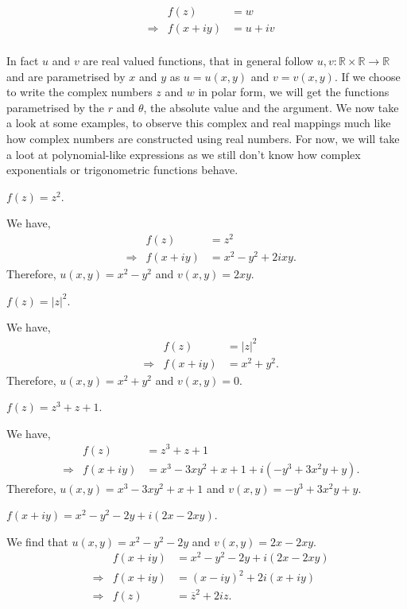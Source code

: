 \documentclass[12pt]{book}
\begin{document}
\begin{align*}
    &&f(z) 
        &= w \\
    &\Rightarrow &f(x + iy) 
        &= u + iv \\
\end{align*}

In fact $u$ and $v$ are real valued functions, that in general follow $u, v: \mathbb{R} \times \mathbb{R} \rightarrow \mathbb{R}$ and are parametrised by $x$ and $y$ as $u = u(x, y)$ and $v = v(x, y)$. If we choose to write the complex numbers $z$ and $w$ in polar form, we will get the functions parametrised by the $r$ and $\theta$, the absolute value and the argument. We now take a look at some examples, to observe this complex and real mappings much like how complex numbers are constructed using real numbers. For now, we will take a loot at polynomial-like expressions as we still don't know how complex exponentials or trigonometric functions behave.

\begin{exmp}
    $f(z) = z^2.$
\end{exmp}
We have,
\begin{align*}
    &&f(z) 
        &= z^2 \\
    &\Rightarrow &f(x + iy) 
        &= x^2 - y^2 + 2ixy .
\end{align*}
Therefore, $u(x, y) = x^2 - y^2$ and $v(x, y) = 2xy.$

\begin{exmp}
    $f(z) = |z|^2.$
\end{exmp}
We have,
\begin{align*}
    &&f(z) 
        &= |z|^2 \\
    &\Rightarrow &f(x + iy) 
        &=  x^2 + y^2.
\end{align*}
Therefore, $u(x, y) = x^2 + y^2$ and $v(x, y) = 0.$

\begin{exmp}
    $f(z) = z^3 + z + 1.$
\end{exmp}
We have,
\begin{align*}
    &&f(z) 
        &= z^3 + z + 1\\
    &\Rightarrow &f(x + iy) 
        &= x^3 - 3xy^2 + x + 1 + i(-y^3 + 3x^2y + y).
\end{align*}
Therefore, $u(x, y) = x^3 - 3xy^2 + x + 1$ and $v(x, y) = -y^3 + 3x^2y + y.$

\begin{exmp}
    $f(x + iy) = x^2 - y^2 - 2y + i(2x - 2xy).$
\end{exmp}
We find that $u(x, y) = x^2 - y^2 - 2y$ and $v(x, y) = 2x - 2xy.$
\begin{align*}
    &&f(x + iy) 
        &= x^2 - y^2 - 2y + i(2x - 2xy)\\
    &\Rightarrow &f(x + iy) 
        &= (x - iy)^2 + 2i(x + iy) \\
    &\Rightarrow &f(z)
        &= \overline{z}^{2} + 2iz.
\end{align*}
\end{document}
